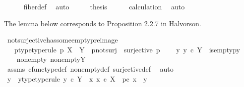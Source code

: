 \begin{isabellebody}
\ \ \ \ \isamarkupfalse%
\ fiber{\isacharunderscore}{\kern0pt}def\ \isamarkupfalse%
\ auto\isanewline
\ \ \isamarkupfalse%
\ \isamarkupfalse%
\ {\isacharquery}{\kern0pt}thesis\isanewline
\ \ \ \ \isamarkupfalse%
\ calculation\ \isamarkupfalse%
\ auto\isanewline
{}\isamarkupfalse%
%
\endisatagproof
{\isafoldproof}%
%
\isadelimproof
%
\endisadelimproof
%
\begin{isamarkuptext}%
The lemma below corresponds to Proposition 2.2.7 in Halvorson.%
\end{isamarkuptext}\isamarkuptrue%
\isamarkupfalse%
\ not{\isacharunderscore}{\kern0pt}surjective{\isacharunderscore}{\kern0pt}has{\isacharunderscore}{\kern0pt}some{\isacharunderscore}{\kern0pt}empty{\isacharunderscore}{\kern0pt}preimage{\isacharcolon}{\kern0pt}\isanewline
\ \ \ p{\isacharunderscore}{\kern0pt}type{\isacharbrackleft}{\kern0pt}type{\isacharunderscore}{\kern0pt}rule{\isacharbrackright}{\kern0pt}{\isacharcolon}{\kern0pt}\ {\isachardoublequoteopen}p{\isacharcolon}{\kern0pt}\ X\ {\isasymrightarrow}\ Y{\isachardoublequoteclose}\ \ p{\isacharunderscore}{\kern0pt}not{\isacharunderscore}{\kern0pt}surj{\isacharcolon}{\kern0pt}\ {\isachardoublequoteopen}{\isasymnot}\ surjective\ p{\isachardoublequoteclose}\isanewline
\ \ \ {\isachardoublequoteopen}{\isasymexists}\ y{\isachardot}{\kern0pt}\ y\ {\isasymin}\isactrlsub c\ Y\ {\isasymand}\ is{\isacharunderscore}{\kern0pt}empty{\isacharparenleft}{\kern0pt}p\isactrlsup {\isacharminus}{\kern0pt}y{\isacharbraceright}{\kern0pt}{\isacharparenright}{\kern0pt}{\isachardoublequoteclose}\isanewline
%
\isadelimproof
%
\endisadelimproof
%
\isatagproof
{}\isamarkupfalse%
\ {\isacharminus}{\kern0pt}\isanewline
\ \ \isamarkupfalse%
\ nonempty{\isacharcolon}{\kern0pt}\ {\isachardoublequoteopen}nonempty{\isacharparenleft}{\kern0pt}Y{\isacharparenright}{\kern0pt}{\isachardoublequoteclose}\isanewline
\ \ \ \ \isamarkupfalse%
\ assms\ cfunc{\isacharunderscore}{\kern0pt}type{\isacharunderscore}{\kern0pt}def\ nonempty{\isacharunderscore}{\kern0pt}def\ surjective{\isacharunderscore}{\kern0pt}def\ \isamarkupfalse%
\ auto\isanewline
\ \ \isamarkupfalse%
\ y{}\ \ y{}{\isacharunderscore}{\kern0pt}type{\isacharbrackleft}{\kern0pt}type{\isacharunderscore}{\kern0pt}rule{\isacharbrackright}{\kern0pt}{\isacharcolon}{\kern0pt}\ {\isachardoublequoteopen}y{}\ {\isasymin}\isactrlsub c\ Y{\isachardoublequoteclose}\ {\isachardoublequoteopen}{\isasymforall}\ x{\isachardot}{\kern0pt}\ x\ {\isasymin}\isactrlsub c\ X\ {\isasymlongrightarrow}\ p{\isasymcirc}\isactrlsub c\ x\ {\isasymnoteq}\ y{}{\isachardoublequoteclose}\isanewline

\end{isabellebody}
